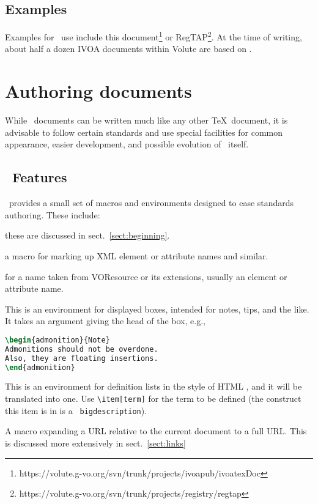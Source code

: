 \documentclass[11pt,a4paper]{ivoa}
\newcommand{\texword}[1]{\texttt{\color{texcolor} #1}}
\begin{document}
\subsection{Examples}

Examples for \ivoatex\ use include this 
document\footnote{https://volute.g-vo.org/svn/trunk/projects/ivoapub/ivoatexDoc}
or
RegTAP\footnote{https://volute.g-vo.org/svn/trunk/projects/registry/regtap}.
At the time of writing, about half a dozen IVOA documents within Volute
are based on \ivoatex.


\section{Authoring documents}
\label{sect:authoring}

While \ivoatex\ documents can be written much like any other \TeX\
document, it is advisable to follow certain standards and use special
facilities for common appearance, easier development, and possible
evolution of \ivoatex\ itself.

\subsection{\ivoatex\ Features}

\ivoatex\ provides a small set of macros and environments designed
to ease standards authoring.  These include:

\begin{bigdescription}
\item[\texword{author}, \texword{previousversion}, \texword{ivoagroup}] these are discussed
in sect.~\ref{sect:beginning}.
\item[\texword{xmlel}] a macro for marking up XML element or attribute
names and similar.  
\item[\texword{vorent}] for a name taken from VOResource or its
extensions, usually an
element or attribute name.
\item[\texword{admonition}] This is an environment for 
displayed boxes, intended for notes, tips, and the like.  
It takes an argument giving the head of the box, e.g.,

\begin{lstlisting}[language=TeX]
\begin{admonition}{Note}
Admonitions should not be overdone.  
Also, they are floating insertions.
\end{admonition}
\end{lstlisting}
\item[\texword{bigdescription}] This is an environment for definition
lists in the style of HTML \xmlel{dl}, and it will be translated into
one.  Use \verb|\item[term]| for the term to be defined
(the construct this item is in is a \texword{bigdescription}).
\item[\texword{auxilaryurl}] A macro expanding a URL relative to the
current document to a full URL.  This is discussed more extensively in
sect.~\ref{sect:links}
\end{bigdescription}
\end{document}

